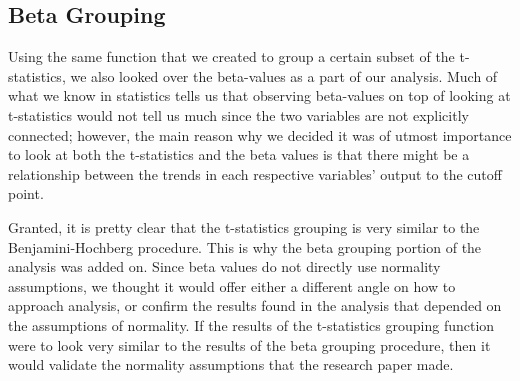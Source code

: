 \subsection{Beta Grouping}

\par Using the same function that we created to group a certain subset of the 
t-statistics, we also looked over the beta-values as a part of our analysis. 
Much of what we know in statistics tells us that observing beta-values on top 
of looking at t-statistics would not tell us much since the two variables are 
not explicitly connected; however, the main reason why we decided it was of 
utmost importance to look at both the t-statistics and the beta values is that 
there might be a relationship between the trends in each respective variables'
output to the cutoff point. 

\par Granted, it is pretty clear that the t-statistics grouping is very similar
to the Benjamini-Hochberg procedure. This is why the beta grouping portion of 
the analysis was added on. Since beta values do not directly use normality 
assumptions, we thought it would offer either a different angle on how to 
approach analysis, or confirm the results found in the analysis that depended 
on the assumptions of normality. If the results of the t-statistics grouping 
function were to look very similar to the results of the beta grouping 
procedure, then it would validate the normality assumptions that the research 
paper made. 